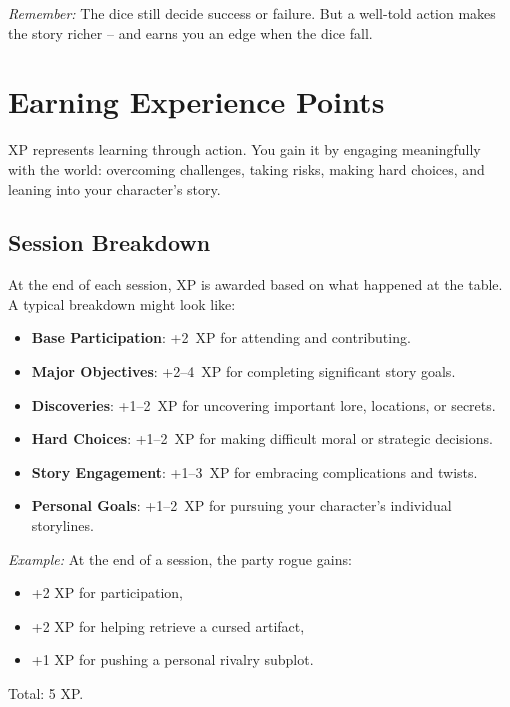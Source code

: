 \noindent
\textit{Remember:} The dice still decide success or failure. But a well-told
action makes the story richer -- and earns you an edge when the dice fall.

\newpage
\section{Earning Experience Points}
\label{sec:earning-xp}

XP represents learning through action. You gain it by engaging meaningfully
with the world: overcoming challenges, taking risks, making hard choices, and
leaning into your character's story.

\subsection{Session Breakdown}
\label{sec:session-xp}
At the end of each session, XP is awarded based on what happened at the table.
A typical breakdown might look like:

\begin{itemize}
  \item \textbf{Base Participation}: +2~XP for attending and contributing.
  \item \textbf{Major Objectives}: +2--4~XP for completing significant story goals.
  \item \textbf{Discoveries}: +1--2~XP for uncovering important lore, locations, or secrets.
  \item \textbf{Hard Choices}: +1--2~XP for making difficult moral or strategic decisions.
  \item \textbf{Story Engagement}: +1--3~XP for embracing complications and twists.
  \item \textbf{Personal Goals}: +1--2~XP for pursuing your character's individual storylines.
\end{itemize}

\emph{Example:} At the end of a session, the party rogue gains:
\begin{itemize}
  \item +2 XP for participation,
  \item +2 XP for helping retrieve a cursed artifact,
  \item +1 XP for pushing a personal rivalry subplot.
\end{itemize}
Total: 5 XP.

